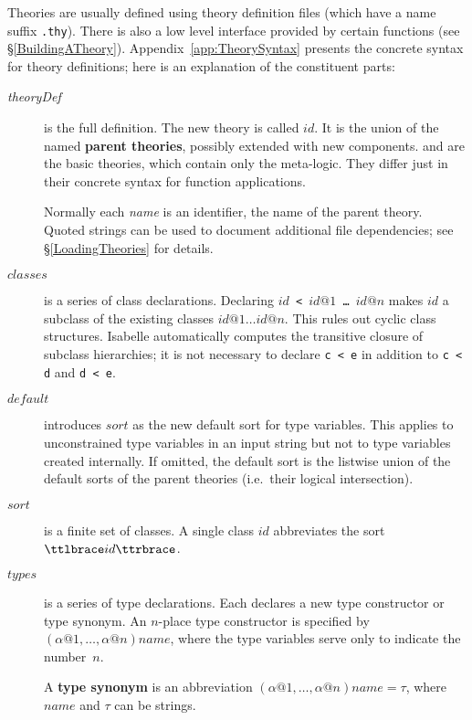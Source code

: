 Theories are usually defined using theory definition files (which have a name
suffix {\tt .thy}).  There is also a low level interface provided by certain
\ML{} functions (see \S\ref{BuildingATheory}).
Appendix~\ref{app:TheorySyntax} presents the concrete syntax for theory
definitions; here is an explanation of the constituent parts:
\begin{description}
\item[{\it theoryDef}] is the full definition.  The new theory is
  called $id$.  It is the union of the named {\bf parent
    theories}, possibly extended with new
  components.   and  are the basic theories,
  which contain only the meta-logic.  They differ just in their
  concrete syntax for function applications.

  Normally each {\it name\/} is an identifier, the name of the parent theory.
  Quoted strings can be used to document additional file dependencies; see
  \S\ref{LoadingTheories} for details.

\item[$classes$]
  is a series of class declarations.  Declaring {\tt$id$ < $id@1$ \dots\
    $id@n$} makes $id$ a subclass of the existing classes $id@1\dots
  id@n$.  This rules out cyclic class structures.  Isabelle automatically
  computes the transitive closure of subclass hierarchies; it is not
  necessary to declare {\tt c < e} in addition to {\tt c < d} and {\tt d <
    e}.

\item[$default$]
  introduces $sort$ as the new default sort for type variables.  This applies
  to unconstrained type variables in an input string but not to type
  variables created internally.  If omitted, the default sort is the listwise
  union of the default sorts of the parent theories (i.e.\ their logical
  intersection).
  
\item[$sort$] is a finite set of classes.  A single class $id$
  abbreviates the sort $\ttlbrace id\ttrbrace$.

\item[$types$]
  is a series of type declarations.  Each declares a new type constructor
  or type synonym.  An $n$-place type constructor is specified by
  $(\alpha@1,\dots,\alpha@n)name$, where the type variables serve only to
  indicate the number~$n$.

  A {\bf type synonym} is an abbreviation
  $(\alpha@1,\dots,\alpha@n)name = \tau$, where $name$ and $\tau$ can
  be strings.


\end{description}
